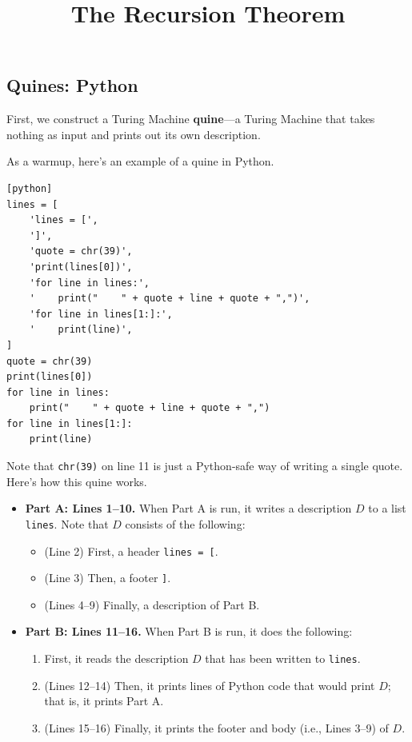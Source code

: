 \title{The Recursion Theorem}



\subsection{Quines: Python}

First, we construct a Turing Machine \textbf{quine}---a
Turing Machine that takes nothing as input
and prints out its own description.

As a warmup, here's an example of a quine in Python.

\begin{verbatim}[python]
lines = [
    'lines = [',
    ']',
    'quote = chr(39)',
    'print(lines[0])',
    'for line in lines:',
    '    print("    " + quote + line + quote + ",")',
    'for line in lines[1:]:',
    '    print(line)',
]
quote = chr(39)
print(lines[0])
for line in lines:
    print("    " + quote + line + quote + ",")
for line in lines[1:]:
    print(line)
\end{verbatim}

Note that \texttt{chr(39)} on line 11
is just a Python-safe way of writing a single quote.
Here's how this quine works.
\begin{itemize}
    \item \textbf{Part A: Lines 1–10.}
    When Part A is run,
    it writes a description $D$
    to a list \texttt{lines}.
    Note that $D$ consists of the following:
    \begin{itemize}
        \item (Line 2) First, a header \texttt{lines = [}.
        \item (Line 3) Then, a footer \texttt{]}.
        \item (Lines 4–9) Finally, a description of Part B.
    \end{itemize}
    \item \textbf{Part B: Lines 11–16.}
    When Part B is run, it does the following:
    \begin{enumerate}
        \item First, it reads the description $D$
        that has been written to \texttt{lines}.
        \item (Lines 12–14) Then, it prints lines of Python code
        that would print $D$; that is, it prints Part A.
        \item (Lines 15–16) Finally, it prints the footer and body (i.e., Lines 3–9) of $D$.
    \end{enumerate}
\end{itemize}

